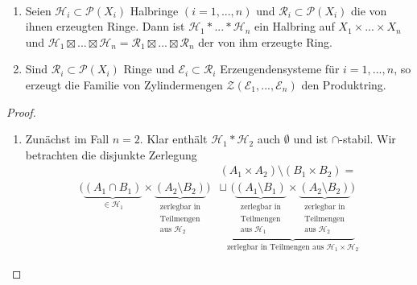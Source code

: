 \begin{proposition}
\begin{mdframed} \
\begin{enumerate}[(\roman*),topsep=5pt]
	\item Seien $\mathcal{H}_i \subset \mathcal{P}(X_i)$ Halbringe $(i=1,...,n)$ und $\mathcal{R}_i \subset \mathcal{P}(X_i)$ die von ihnen erzeugten Ringe. Dann ist $\mathcal{H}_1 \ast ... \ast \mathcal{H}_n$ ein Halbring auf $X_1 \times ... \times X_n$ und $\mathcal{H}_1 \boxtimes ... \boxtimes \mathcal{H}_n =\mathcal{R}_1 \boxtimes ... \boxtimes \mathcal{R}_n$ der von ihm erzeugte Ring.
	\item Sind $\mathcal{R}_i \subset \mathcal{P}(X_i)$ Ringe und $\mathcal{E}_i \subset \mathcal{R}_i$ Erzeugendensysteme für $i=1,...,n$, so erzeugt die Familie von Zylindermengen $\mathcal{Z}(\mathcal{E}_1,...,\mathcal{E}_n)$ den Produktring.
\end{enumerate}
\end{mdframed}
\label{propC}
\begin{proof} \
\begin{enumerate}[(\roman*),topsep=5pt]
	\item Zunächst im Fall $n=2$. Klar enthält $\mathcal{H}_1 \ast \mathcal{H}_2$ auch $\emptyset$ und ist $\cap$-stabil. Wir betrachten die disjunkte Zerlegung
	\begin{equation*}
	\begin{split}
		&(A_1 \times A_2) \setminus (B_1 \times B_2) =\\
	 \big( \underbrace{(A_1 \cap B_1)}_{\in \mathcal{H}_1} \times \underbrace{(A_2 \setminus B_2)}_{\substack{\text{zerlegbar in} \\ \text{Teilmengen}\\ \text{aus }\mathcal{H}_2}} \big) & \sqcup \underbrace{\big( \underbrace{(A_1 \setminus B_1)}_{\substack{\text{zerlegbar in} \\ \text{Teilmengen}\\ \text{aus }\mathcal{H}_1}} \times \underbrace{(A_2 \setminus B_2)}_{\substack{\text{zerlegbar in} \\ \text{Teilmengen}\\ \text{aus }\mathcal{H}_2}} \big)}_{\text{zerlegbar in Teilmengen aus } \mathcal{H}_1 \times \mathcal{H}_2}

\end{split}
\end{equation*}
\end{enumerate}
\end{proof}
\end{proposition}
